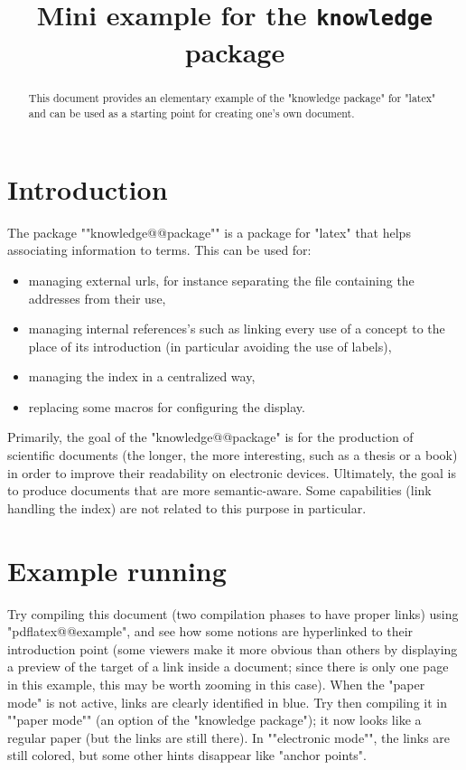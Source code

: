 \documentclass{article}
\title{Mini example for the \texttt{knowledge} package}
\date{}
\begin{document}
\maketitle
\begin{abstract}
\AP This document provides an elementary example of the "knowledge package" for "latex" and can be used as a starting point for creating one's own document.
\end{abstract}

\section{Introduction}
\label{section:introduction}

The package ""knowledge@@package"" is a package for "latex" that helps associating information to terms. This can be used for:
\begin{itemize}
\item managing external urls, for instance separating the file containing  the addresses from their use,
\item managing internal references's such as linking every use of a concept to the place of its introduction (in particular avoiding the use of labels),
\item managing the index in a centralized way,
\item replacing some macros for configuring the display.
\end{itemize}
Primarily, the goal of the "knowledge@@package" is for the production of scientific documents (the longer, the more interesting, such as a thesis or a book) in order to improve their readability on electronic devices. Ultimately, the goal is to produce documents that are more semantic-aware. Some capabilities (link handling the index) are not related to this purpose in particular.

\section{Example running}
\label{section:example}
Try compiling this document (two compilation phases to have proper links) using "pdflatex@@example", and see how some notions are hyperlinked to their introduction point (some viewers make it more obvious than others by displaying a preview of the target of a link inside a document; since there is only one page in this example, this may be worth zooming in this case).
\AP When the "paper mode" is not active, links are clearly identified in blue. Try then compiling it in ""paper mode"" (an option of the "knowledge package"); it now looks like a regular paper (but the links are still there). In ""electronic mode"",
the links are still colored, but some other hints disappear like "anchor points".
\end{document}
